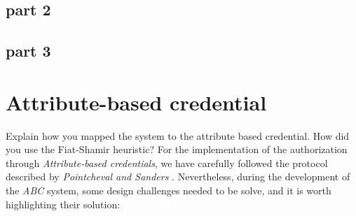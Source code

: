 \documentclass[10pt,conference,compsocconf]{IEEEtran}
\begin{document}
\subsection{part 2}
\subsection{part 3}
\section{Attribute-based credential}
Explain how you mapped the system to the attribute based credential. How did you
use the Fiat-Shamir heuristic?
For the implementation of the authorization through \textit{Attribute-based credentials}, we have carefully followed the protocol
described by \textit{Pointcheval and Sanders} \cite{PS_signature}. Nevertheless, during the development of the \textit{ABC} system,
some design challenges needed to be solve, and it is worth highlighting their solution:
\end{document}
